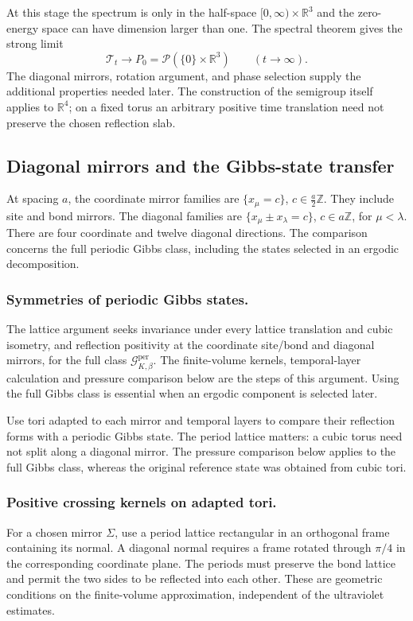 \documentclass[11pt,letterpaper,reqno]{amsart}
\theoremstyle{definition}
\theoremstyle{remark}
\newcommand{\R}{\mathbb R}
\begin{document}
At this stage the spectrum is only in the half-space
$[0,\infty)\times\R^3$ and the zero-energy space can have dimension
larger than one. The spectral theorem gives the strong limit
\[
 \mathcal T_t\longrightarrow P_0
        =\mathcal P(\{0\}\times\R^3)\qquad(t\to\infty).
\]
The diagonal mirrors, rotation argument, and phase selection supply the
additional properties needed later. The construction of the semigroup
itself applies to $\R^4$; on a fixed torus an arbitrary positive time
translation need not preserve the chosen reflection slab.

\subsection{Diagonal mirrors and the Gibbs-state transfer}

At spacing $a$, the coordinate mirror families are
$\{x_\mu=c\}$, $c\in\tfrac a2\mathbb Z$. They include site and
bond mirrors. The diagonal families are
$\{x_\mu\pm x_\lambda=c\}$, $c\in a\mathbb Z$, for $\mu<\lambda$.
There are four coordinate and twelve diagonal directions. The
comparison concerns the full periodic Gibbs class, including the
states selected in an ergodic decomposition.
\subsubsection*{Symmetries of periodic Gibbs states.}
\label{hyp:gibbs-reflections}
The lattice argument seeks invariance under every lattice translation
and cubic isometry, and reflection positivity at the coordinate
site/bond and diagonal mirrors, for the full class
$\mathcal G^{\mathrm{per}}_{K,\beta}$. The finite-volume kernels,
temporal-layer calculation and pressure comparison below are the
steps of this argument. Using the full Gibbs class is essential when
an ergodic component is selected later.

Use tori adapted to each mirror and temporal layers to compare their
reflection forms with a periodic Gibbs state. The period lattice
matters: a cubic torus need not split along a diagonal mirror. The
pressure comparison below applies to the full Gibbs class, whereas
the original reference state was obtained from cubic tori.

\subsubsection*{Positive crossing kernels on adapted tori.}
For a chosen mirror $\Sigma$, use a period lattice rectangular in an
orthogonal frame containing its normal. A diagonal normal requires a
frame rotated through $\pi/4$ in the corresponding coordinate plane.
The periods must preserve the bond lattice and permit the two sides
to be reflected into each other. These are geometric conditions on
the finite-volume approximation, independent of the ultraviolet
estimates.
\end{document}
